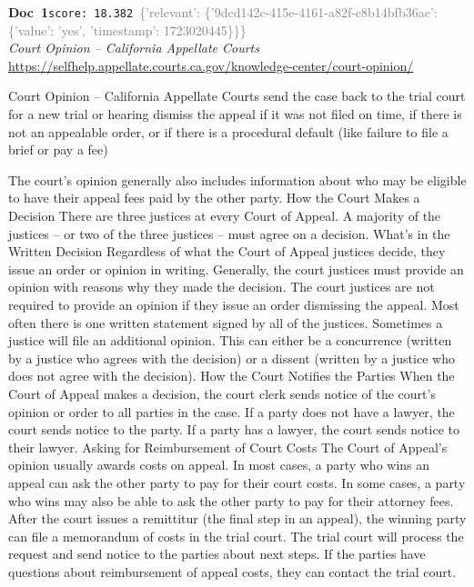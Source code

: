 \documentclass[a4paper,11pt]{article}
\begin{document}
\begin{docenv}
{\footnotesize\textcolor{doccolor}{\textbf{Doc~1}}}\hfill{\tiny\texttt{score:~18.382}}\ {\tiny\textcolor{gray}{\{'relevant': \{'9dcd142c-415e-4161-a82f-c8b14bfb36ac': \{'value': 'yes', 'timestamp': 1723020445\}\}\}}}\\[3pt]
{\small\textit{Court Opinion – California Appellate Courts}}\\[2pt]
{\tiny\url{https://selfhelp.appellate.courts.ca.gov/knowledge-center/court-opinion/}}\\[4pt]
{\footnotesize Court Opinion – California Appellate Courts
send the case back to the trial court for a new trial or hearing
dismiss the appeal if it was not filed on time, if there is not an appealable order, or if there is a procedural default (like failure to file a brief or pay a fee)

The court’s opinion generally also includes information about who may be eligible to have their appeal fees paid by the other party.
How the Court Makes a Decision
There are three justices at every Court of Appeal. A majority of the justices – or two of the three justices – must agree on a decision.
What’s in the Written Decision
Regardless of what the Court of Appeal justices decide, they issue an order or opinion in writing. Generally, the court justices must provide an opinion with reasons why they made the decision. The court justices are not required to provide an opinion if they issue an order dismissing the appeal.
Most often there is one written statement signed by all of the justices. Sometimes a justice will file an additional opinion. This can either be a concurrence (written by a justice who agrees with the decision) or a dissent (written by a justice who does not agree with the decision).
How the Court Notifies the Parties
When the Court of Appeal makes a decision, the court clerk sends notice of the court’s opinion or order to all parties in the case. If a party does not have a lawyer, the court sends notice to the party. If a party has a lawyer, the court sends notice to their lawyer.
Asking for Reimbursement of Court Costs
The Court of Appeal’s opinion usually awards costs on appeal.
In most cases, a party who wins an appeal can ask the other party to pay for their court costs. In some cases, a party who wins may also be able to ask the other party to pay for their attorney fees.
After the court issues a remittitur (the final step in an appeal), the winning party can file a memorandum of costs in the trial court. The trial court will process the request and send notice to the parties about next steps. If the parties have questions about reimbursement of appeal costs, they can contact the trial court.}
\end{docenv}
\end{document}
